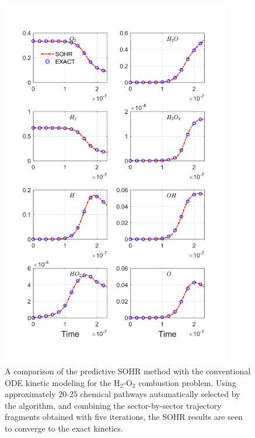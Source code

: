 \begin{figure}[htbp]
	\caption[A comparison of the predictive SOHR method with the conventional ODE]
	{A comparison of the predictive SOHR method with the
conventional ODE kinetic modeling for the H$_2$-O$_2$ combustion
problem. Using approximately 20-25 chemical pathways automatically
selected by the algorithm, and combining the sector-by-sector
trajectory fragments obtained with five iterations, the SOHR results
are seen to converge to the exact kinetics.}
    \begin{center}
	\includegraphics[width=100mm]{figs/chapter4/fig6.png}
    \end{center}
\label{ch4:fig:6}
\end{figure}

